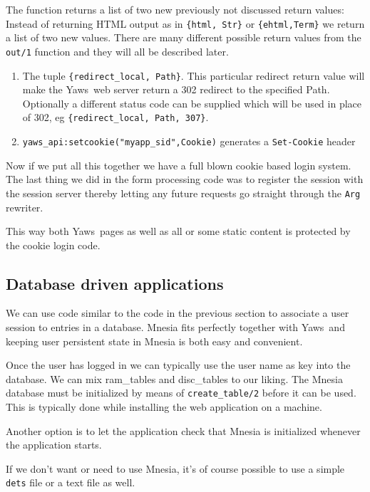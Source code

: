\documentclass[11pt,oneside,english]{book}
\newcommand{\Yaws}            %
        {{\sc Yaws}}
\begin{document}
The function returns a list of two new previously not discussed return
values: Instead
of returning HTML output as in \verb+{html, Str}+ or
\verb+{ehtml,Term}+
we return a list of two new values. There are many different possible
return values from the \verb+out/1+ function and they will all be
described later.

\begin{enumerate}

\item The tuple \verb+{redirect_local, Path}+.
This particular redirect return value will make the
\Yaws\  web server return a 302 redirect to the specified Path.
Optionally a different status code can be supplied which will
be used in place of 302, eg \verb+{redirect_local, Path, 307}+.

\item \verb+yaws_api:setcookie("myapp_sid",Cookie)+ generates
a \verb+Set-Cookie+ header
\end{enumerate}



Now if we put all this together we have a full blown cookie based
login system. The last thing we did in the form processing code was
to register the session with the session server thereby letting any
future requests go straight through the \verb+Arg+ rewriter.

This way both \Yaws\  pages as well as all or some static content
is protected by the cookie login code.


\subsection{Database driven applications}

We can use code similar to the code in the previous section to associate
a user session to entries in a database. Mnesia fits perfectly
together with \Yaws\  and keeping user persistent state in Mnesia is
both easy and convenient.

Once the user has logged in we can typically use the user name
as key into the database. We can mix ram\_tables and disc\_tables
to our liking. The Mnesia database must be initialized by means
of \verb+create_table/2+ before it
can be used. This is typically done while installing the
web application on a machine.

Another option is to let the application check that Mnesia
is initialized whenever the application starts.

If we don't want or need to use Mnesia, it's of course possible
to use a simple \verb+dets+ file or a text file as well.
\end{document}
